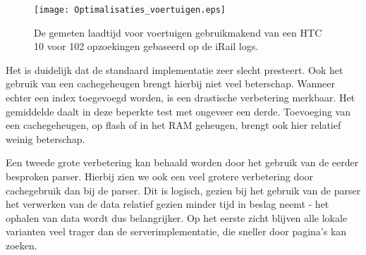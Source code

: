 \begin{figure}[h]
	\centering
	\texttt{[image: Optimalisaties\_voertuigen.eps]}
	\caption[Gemeten laadtijd voertuigen]{De gemeten laadtijd voor voertuigen gebruikmakend van een HTC 10 voor 102 opzoekingen gebaseerd op de iRail logs. }
	\label{fig:vehiclelabtest}
\end{figure}

%		
%		

Het is duidelijk dat de standaard implementatie zeer slecht presteert. Ook het gebruik van een cachegeheugen brengt hierbij niet veel beterschap. Wanneer echter een index toegevoegd worden, is een drastische verbetering merkbaar. Het gemiddelde daalt in deze beperkte test met ongeveer een derde. Toevoeging van een cachegeheugen, op flash of in het RAM geheugen, brengt ook hier relatief weinig beterschap. 

Een tweede grote verbetering kan behaald worden door het gebruik van de eerder besproken  parser. Hierbij zien we ook een veel grotere verbetering door cachegebruik dan bij de  parser. Dit is logisch, gezien bij het gebruik van de  parser het verwerken van de data relatief gezien minder tijd in beslag neemt - het ophalen van data wordt dus belangrijker. Op het eerste zicht blijven alle lokale varianten veel trager dan de serverimplementatie, die sneller door pagina's kan zoeken.

